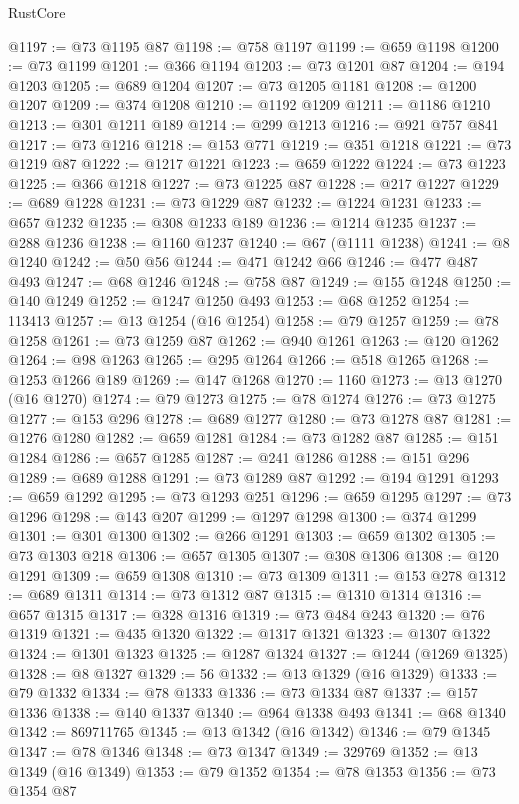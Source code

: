 \begin{lexlean}{RustCore}
\begin{coremodule}
@1197 := @73 @1195 @87
@1198 := @758 @1197
@1199 := @659 @1198
@1200 := @73 @1199
@1201 := @366 @1194
@1203 := @73 @1201 @87
@1204 := @194 @1203
@1205 := @689 @1204
@1207 := @73 @1205 @1181
@1208 := @1200 @1207
@1209 := @374 @1208
@1210 := @1192 @1209
@1211 := @1186 @1210
@1213 := @301 @1211 @189
@1214 := @299 @1213
@1216 := @921 @757 @841
@1217 := @73 @1216
@1218 := @153 @771
@1219 := @351 @1218
@1221 := @73 @1219 @87
@1222 := @1217 @1221
@1223 := @659 @1222
@1224 := @73 @1223
@1225 := @366 @1218
@1227 := @73 @1225 @87
@1228 := @217 @1227
@1229 := @689 @1228
@1231 := @73 @1229 @87
@1232 := @1224 @1231
@1233 := @657 @1232
@1235 := @308 @1233 @189
@1236 := @1214 @1235
@1237 := @288 @1236
@1238 := @1160 @1237
@1240 := @67 (@1111 @1238)
@1241 := @8 @1240
@1242 := @50 @56
@1244 := @471 @1242 @66
@1246 := @477 @487 @493
@1247 := @68 @1246
@1248 := @758 @87
@1249 := @155 @1248
@1250 := @140 @1249
@1252 := @1247 @1250 @493
@1253 := @68 @1252
@1254 := 113413
@1257 := @13 @1254 (@16 @1254)
@1258 := @79 @1257
@1259 := @78 @1258
@1261 := @73 @1259 @87
@1262 := @940 @1261
@1263 := @120 @1262
@1264 := @98 @1263
@1265 := @295 @1264
@1266 := @518 @1265
@1268 := @1253 @1266 @189
@1269 := @147 @1268
@1270 := 1160
@1273 := @13 @1270 (@16 @1270)
@1274 := @79 @1273
@1275 := @78 @1274
@1276 := @73 @1275
@1277 := @153 @296
@1278 := @689 @1277
@1280 := @73 @1278 @87
@1281 := @1276 @1280
@1282 := @659 @1281
@1284 := @73 @1282 @87
@1285 := @151 @1284
@1286 := @657 @1285
@1287 := @241 @1286
@1288 := @151 @296
@1289 := @689 @1288
@1291 := @73 @1289 @87
@1292 := @194 @1291
@1293 := @659 @1292
@1295 := @73 @1293 @251
@1296 := @659 @1295
@1297 := @73 @1296
@1298 := @143 @207
@1299 := @1297 @1298
@1300 := @374 @1299
@1301 := @301 @1300
@1302 := @266 @1291
@1303 := @659 @1302
@1305 := @73 @1303 @218
@1306 := @657 @1305
@1307 := @308 @1306
@1308 := @120 @1291
@1309 := @659 @1308
@1310 := @73 @1309
@1311 := @153 @278
@1312 := @689 @1311
@1314 := @73 @1312 @87
@1315 := @1310 @1314
@1316 := @657 @1315
@1317 := @328 @1316
@1319 := @73 @484 @243
@1320 := @76 @1319
@1321 := @435 @1320
@1322 := @1317 @1321
@1323 := @1307 @1322
@1324 := @1301 @1323
@1325 := @1287 @1324
@1327 := @1244 (@1269 @1325)
@1328 := @8 @1327
@1329 := 56
@1332 := @13 @1329 (@16 @1329)
@1333 := @79 @1332
@1334 := @78 @1333
@1336 := @73 @1334 @87
@1337 := @157 @1336
@1338 := @140 @1337
@1340 := @964 @1338 @493
@1341 := @68 @1340
@1342 := 869711765
@1345 := @13 @1342 (@16 @1342)
@1346 := @79 @1345
@1347 := @78 @1346
@1348 := @73 @1347
@1349 := 329769
@1352 := @13 @1349 (@16 @1349)
@1353 := @79 @1352
@1354 := @78 @1353
@1356 := @73 @1354 @87

\end{coremodule}
\end{lexlean}

